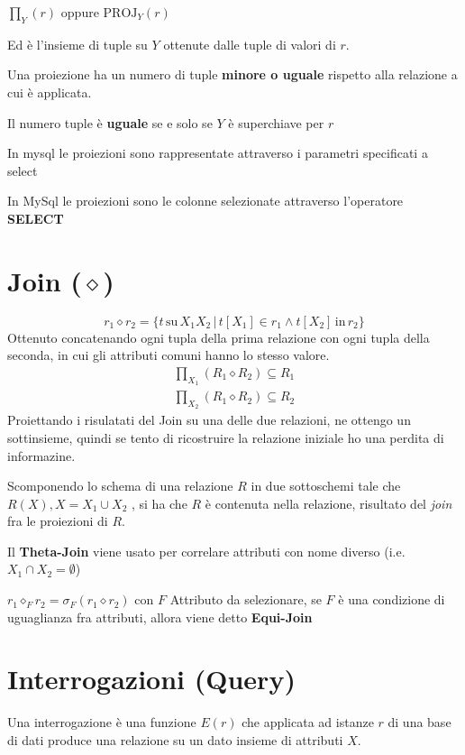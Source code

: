 \documentclass{paper}
\begin{document}
\begin{center}
    $\prod_Y(r)$ oppure $\text{PROJ}_Y(r)$
\end{center}

Ed è l'insieme di tuple su $Y$ ottenute dalle tuple di valori di $r$.

Una proiezione ha un numero di tuple \textbf{minore o uguale} rispetto alla relazione a cui è applicata.

Il numero tuple è \textbf{uguale} se e solo se $Y$ è superchiave per $r$

In mysql le proiezioni sono rappresentate attraverso i parametri specificati a select

In MySql le proiezioni sono le colonne selezionate attraverso l'operatore \textbf{SELECT}

\section{Join ($\diamond$)}
\[
    r_1 \diamond r_2 = \{ t\,\text{su}\,X_1 X_2 \, | \,  t[X_1] \in r_1 \wedge t[X_2]\,\text{in}\, r_2\}
\]
Ottenuto concatenando ogni tupla della prima relazione con ogni tupla della seconda, in cui gli attributi comuni hanno lo stesso valore.
\[
\begin{split}
    \prod_{X_1} (R_1 \diamond R_2) \subseteq R_1\\
    \prod_{X_2} (R_1 \diamond R_2) \subseteq R_2
\end{split}
\]
Proiettando i risulatati del Join su una delle due relazioni, ne ottengo un sottinsieme, quindi se tento di ricostruire la relazione iniziale ho una perdita di informazine.

Scomponendo lo schema di una relazione $R$ in due sottoschemi tale che $R(X), X = X_1 \cup X_2$ , si ha che $R$ è contenuta nella relazione, risultato del \textit{join} fra le proiezioni di $R$.

Il \textbf{Theta-Join} viene usato per correlare attributi con nome diverso (i.e. $X_1 \cap X_2 = \emptyset$)

$r_1 \diamond_F r_2 = \sigma_F(r_1 \diamond r_2)$ con $F$ Attributo da selezionare, se $F$ è una condizione di uguaglianza fra attributi, allora viene detto \textbf{Equi-Join}
\section{Interrogazioni (Query)}
Una interrogazione è una funzione $E(r)$ che applicata ad istanze $r$ di una base di dati produce una relazione su un dato insieme di attributi $X$.
\end{document}
